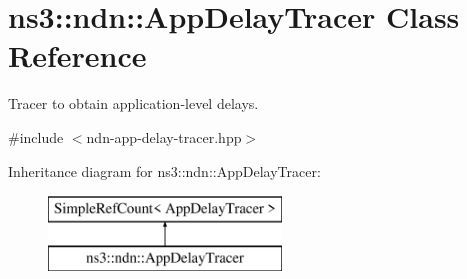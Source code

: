 \hypertarget{classns3_1_1ndn_1_1AppDelayTracer}{}\section{ns3\+:\+:ndn\+:\+:App\+Delay\+Tracer Class Reference}
\label{classns3_1_1ndn_1_1AppDelayTracer}


Tracer to obtain application-\/level delays.  




{\ttfamily \#include $<$ndn-\/app-\/delay-\/tracer.\+hpp$>$}

Inheritance diagram for ns3\+:\+:ndn\+:\+:App\+Delay\+Tracer\+:\begin{figure}[H]
\begin{center}
\leavevmode
\includegraphics[height=2.000000cm]{classns3_1_1ndn_1_1AppDelayTracer}
\end{center}
\end{figure}
